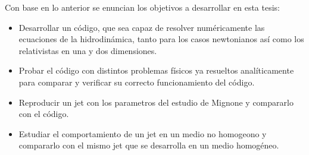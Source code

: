 \documentclass[12pt,a4paper]{book}
\begin{document}
{\color{blue} Con base en lo anterior se enuncian los objetivos a desarrollar en esta tesis:
\begin{itemize}
  \item Desarrollar un código, que sea capaz de resolver numéricamente las ecuaciones de la hidrodinámica, tanto para los casos newtonianos así como los relativistas en una y dos dimensiones.
  \item Probar el código con distintos problemas físicos ya resueltos analíticamente para comparar y verificar su correcto funcionamiento del código.
  \item Reproducir un jet con los parametros del estudio de Mignone y compararlo con el código.
  \item Estudiar el comportamiento de un jet en un medio no homogeono y compararlo con el mismo jet que se desarrolla en un medio homogéneo.
\end{itemize}

}










 
\end{document}
